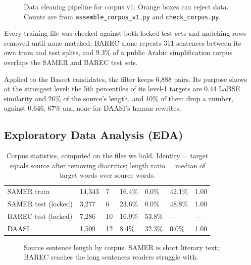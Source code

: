 \documentclass[10pt,a4paper]{article}
\begin{document}
\begin{figure}[h]
\centering
\resizebox{\linewidth}{!}{\figcleaning}
\caption{Data cleaning pipeline for corpus v1. Orange boxes can reject data. Counts
are from \texttt{assemble\_corpus\_v1.py} and \texttt{check\_corpus.py}.}
\label{fig:cleaning}
\end{figure}

 Every training file was checked against both locked test sets and
matching rows removed until none matched; BAREC alone repeats 311 sentences
between its own train and test splits, and 9.3\% of a public Arabic
simplification corpus overlaps the SAMER and BAREC test sets.

 Applied to the Baseet candidates, the filter keeps 6,888
pairs. Its purpose shows at the strongest level: the 5th percentiles of its
level-1 targets are 0.44 LaBSE similarity and 26\% of the source's length, and
10\% of them drop a number, against 0.646, 67\% and none for DAASI's human
rewrites.

\subsection{Exploratory Data Analysis (EDA)}
\label{sec:eda}

\begin{table}[h]
\small
\caption{Corpus statistics, computed on the files we hold. Identity = target
equals source after removing diacritics; length ratio = median of target words
over source words.}
\label{tab:eda}
\begin{tabularx}{\linewidth}{|L|C{17mm}|C{15mm}|C{15mm}|C{17mm}|C{15mm}|C{15mm}|}
\hline
{} &  &  &  &  &  &  \\ \hline
SAMER train          & 14,343 &  7 & 16.4\% & 0.0\%  & 42.1\% & 1.00 \\ \hline
SAMER test (locked)  &  3,277 &  6 & 23.6\% & 0.0\%  & 48.8\% & 1.00 \\ \hline
BAREC test (locked)  &  7,286 & 10 & 16.9\% & 53.8\% & ---    & ---  \\ \hline
DAASI                &  1,509 & 12 &  8.4\% & 32.3\% & 0.0\%  & 1.00 \\ \hline
\end{tabularx}
\end{table}

\begin{figure}[h]
\centering
\figlengths
\caption{Source sentence length by corpus. SAMER is short literary text; BAREC
reaches the long sentences readers struggle with.}
\label{fig:lengths}
\end{figure}
\end{document}
